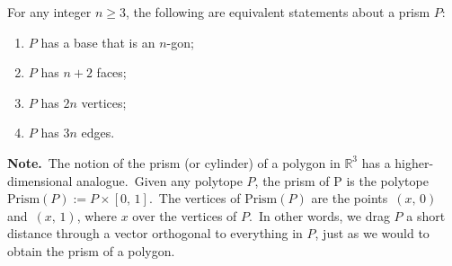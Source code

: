 \documentclass{article}
\theoremstyle{definition}
\begin{document}
For any integer $n \ge 3$, the following are equivalent statements about a prism $P$:

\begin{enumerate}
\item $P$ has a base that is an $n$-gon;
\item $P$ has $n+2$ faces;
\item $P$ has $2n$ vertices;
\item $P$ has $3n$ edges.
\end{enumerate}

\textbf{Note.}\, The notion of the prism (or cylinder) of a polygon in $\mathbb{R}^3$ has a higher-dimensional analogue.\, Given any polytope $P$, the
prism of P is the polytope\, $\mbox{Prism}(P) := P\!\times\![0,\,1]$.\, The
vertices of $\mbox{Prism}(P)$ are the points\, $(x,\,0)$ and\, $(x,\,1)$, where
$x$  over the vertices of $P$.\, In other words, we drag
$P$ a short distance through a vector orthogonal to everything
in $P$, just as we would to obtain the prism of a polygon.
\end{document}
